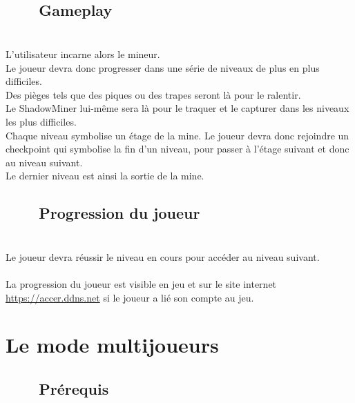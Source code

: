 \documentclass[titlepage, 13px, a4paper]{report}
\begin{document}
\subsection[Gameplay]{~~~~Gameplay}
\paragraph*{} \hspace{0pt} \\
L’utilisateur incarne alors le mineur. \\
Le joueur devra donc progresser dans une série de niveaux de plus en plus difficiles. \\
Des pièges tels que des piques ou des trapes seront là pour le ralentir. \\
Le ShadowMiner lui-même sera là pour le traquer et le capturer dans les niveaux les plus difficiles. \\
Chaque niveau symbolise un étage de la mine. Le joueur devra donc rejoindre un checkpoint 
qui symbolise la fin d’un niveau, pour passer à l’étage suivant et donc au niveau suivant. \\
Le dernier niveau est ainsi la sortie de la mine. \\ 

\subsection[Progression du joueur]{~~~~Progression du joueur}
\paragraph*{} \hspace{0pt} \\
Le joueur devra réussir le niveau en cours pour accéder au niveau suivant. \\ \\
La progression du joueur est visible en jeu et sur le site internet \url{https://accer.ddns.net} si le joueur a lié son compte au jeu. \\

\newpage

\section{Le mode multijoueurs}

\subsection[Prérequis]{~~~~Prérequis}
\end{document}
